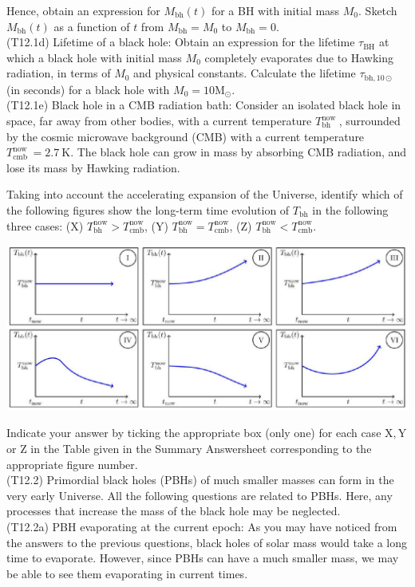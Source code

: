 \documentclass[10pt]{article}
\begin{document}
    Hence, obtain an expression for $M_{\mathrm{bh}}(t)$ for a BH with initial mass $M_{0}$. Sketch $M_{\mathrm{bh}}(t)$ as a function of $t$ from $M_{\mathrm{bh}}=M_{0}$ to $M_{\mathrm{bh}}=0$.\\
    (T12.1d) Lifetime of a black hole: Obtain an expression for the lifetime $\tau_{\mathrm{BH}}$ at which a black hole with initial mass $M_{0}$ completely evaporates due to Hawking radiation, in terms of $M_{0}$ and physical constants. Calculate the lifetime $\tau_{\mathrm{bh}, 10 \odot}$ (in seconds) for a black hole with $M_{0}=10 \mathrm{M}_{\odot}$.\\
    (T12.1e) Black hole in a CMB radiation bath: Consider an isolated black hole in space, far away from other bodies, with a current temperature $T_{\mathrm{bh}}^{\text {now }}$, surrounded by the cosmic microwave background (CMB) with a current temperature $T_{\mathrm{cmb}}^{\text {now }}=2.7 \mathrm{~K}$. The black hole can grow in mass by absorbing CMB radiation, and lose its mass by Hawking radiation.
    
    Taking into account the accelerating expansion of the Universe, identify which of the following figures show the long-term time evolution of $T_{\mathrm{bh}}$ in the following three cases: (X) $T_{\mathrm{bh}}^{\mathrm{now}}>T_{\mathrm{cmb}}^{\mathrm{now}}$, (Y) $T_{\mathrm{bh}}^{\mathrm{now}}=T_{\mathrm{cmb}}^{\mathrm{now}}$, (Z) $T_{\mathrm{bh}}^{\mathrm{now}}<T_{\mathrm{cmb}}^{\mathrm{now}}$.

    \includegraphics[max width=\textwidth, center]{2025_08_23_e94579452776a99c4850g-18}
    
    Indicate your answer by ticking the appropriate box (only one) for each case $\mathrm{X}, \mathrm{Y}$ or Z in the Table given in the Summary Answersheet corresponding to the appropriate figure number.\\
    (T12.2) Primordial black holes (PBHs) of much smaller masses can form in the very early Universe. All the following questions are related to PBHs. Here, any processes that increase the mass of the black hole may be neglected.\\
    (T12.2a) PBH evaporating at the current epoch: As you may have noticed from the answers to the previous questions, black holes of solar mass would take a long time to evaporate. However, since PBHs can have a much smaller mass, we may be able to see them evaporating in current times.
    
\end{document}
